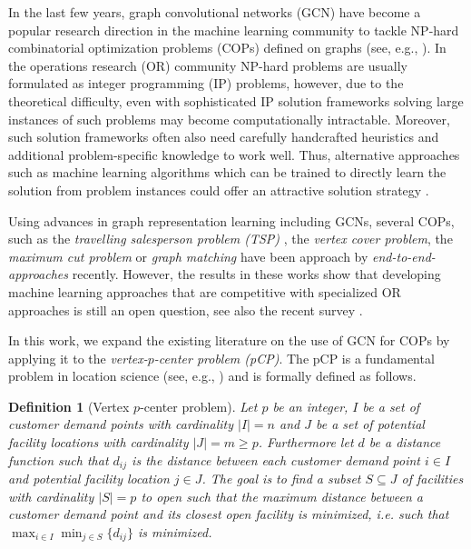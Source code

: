 \documentclass[]{article}
\newtheorem{definition}[theorem]{Definition}
\newcommand{\loc}{J}
\newcommand{\cus}{I}
\newcommand{\PCP}{pCP\xspace}
\begin{document}
In the last few years, graph convolutional networks (GCN) have become a popular 
research direction in the machine learning community to tackle NP-hard 
combinatorial optimization problems (COPs) defined on graphs (see, e.g., 
\citep{cappart2021combinatorial,li2018combinatorial}). In the operations 
research (OR) community NP-hard problems are usually formulated as integer 
programming (IP) problems, however, due to the theoretical difficulty, even 
with sophisticated IP solution frameworks solving large instances of such 
problems may become computationally intractable. Moreover, such solution 
frameworks often also need carefully handcrafted heuristics and additional 
problem-specific knowledge to work well. Thus, alternative approaches such as 
machine learning algorithms which can be trained to directly learn the solution 
from problem instances could offer an attractive solution strategy 
\cite{bengio2020machine,smith1999neural}.

Using advances in graph representation learning including GCNs, several COPs, 
such as the \emph{travelling salesperson problem (TSP)} 
\cite{kool2018attention,joshi2019efficient,joshi2020learning}, the \emph{vertex 
cover problem}, the \emph{maximum cut problem} 
\cite{dai2017learning,li2018combinatorial} or \emph{graph matching} 
\cite{fey2020deep} have been approach by \emph{end-to-end-approaches} recently. 
However, the results in these works show that developing machine learning 
approaches that are competitive with specialized OR approaches is still an 
open question, see also the recent survey \cite{cappart2021combinatorial}.

In this work, we expand the existing literature on the use of GCN for COPs by 
applying it to the \emph{vertex-$p$-center problem (\PCP)}. The \PCP is a 
fundamental problem in location science (see, e.g., \cite{laporte2019location}) 
and is formally defined as follows.

\begin{definition}[Vertex $p$-center problem]
Let $p$ be an integer, $\cus$ be  a 
set of customer 
demand points with cardinality $|\cus|=n$ and $\loc$ be a set of potential 
facility 
locations  with cardinality $|\loc|=m \geq p$. Furthermore let $d$ be a 
distance 
function  such that $d_{ij}$ is the distance between each
	customer 
	demand point $i \in \cus $ and potential facility location $j \in \loc$. The goal is to
	find a subset $S \subseteq \loc$ of facilities with cardinality $|S|=p$ to 
	\emph{open} such that the maximum 
	distance between a customer demand point and its closest 
	open facility is minimized, i.e. such that 
	$\max_{i \in \cus} \min_{j \in S} \{d_{ij} \}$ is minimized.	
\end{definition}	
\end{document}
